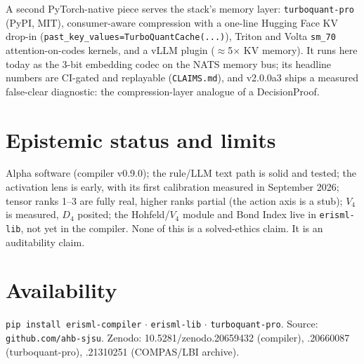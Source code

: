 \documentclass[10pt,twocolumn]{article}
\begin{document}
A second PyTorch-native piece serves the stack's memory layer:
\texttt{turboquant-pro} (PyPI, MIT), consumer-aware compression with a one-line
Hugging Face KV drop-in (\texttt{past\_key\_values=TurboQuantCache(...)}), Triton
and Volta \texttt{sm\_70} attention-on-codes kernels, and a vLLM plugin
($\approx$5$\times$ KV memory). It runs here today as the 3-bit embedding codec on
the NATS memory bus; its headline numbers are CI-gated and replayable
(\texttt{CLAIMS.md}), and v2.0.0a3 ships a measured false-clear diagnostic: the compression-layer analogue of a DecisionProof.

\section{Epistemic status and limits}
Alpha software (compiler v0.9.0); the rule/LLM text path is solid and tested; the
activation lens is early, with its first calibration measured in September 2026; tensor ranks 1--3 are fully real, higher
ranks partial (the action axis is a stub); $V_4$ is measured, $D_4$ posited; the
Hohfeld/$V_4$ module and Bond Index live in \texttt{erisml-lib}, not yet in the
compiler. None of this is a solved-ethics claim. It is an auditability claim.

\section*{Availability}
\texttt{pip install erisml-compiler} $\cdot$ \texttt{erisml-lib} $\cdot$ \texttt{turboquant-pro}. Source:
\texttt{github.com/ahb-sjsu}. Zenodo: 10.5281/zenodo.20659432 (compiler),
.20660087 (turboquant-pro), .21310251 (COMPAS/LBI archive).

\medskip
{}
\end{document}
